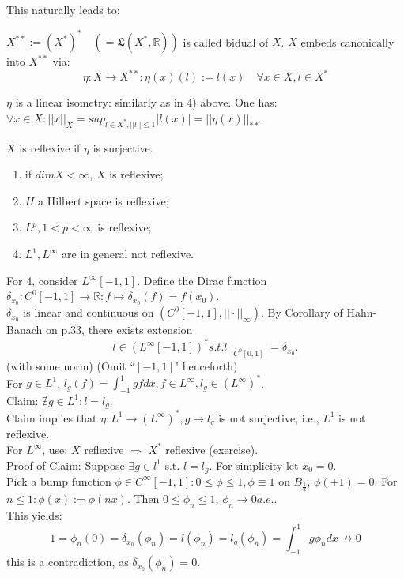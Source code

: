 \documentclass{article}
\begin{document}
This naturally leads to:\begin{definition}
    $X^{**} := (X^*)^* \quad (=\mathfrak{L}(X^*,\mathbb{R}))$ is called bidual of $X$. $X$ embeds canonically into $X^{**}$ via: $$ \eta : X\rightarrow X^{**}: \eta(x)(l) := l(x) \quad \forall x \in X, l \in X^*$$ 
\end{definition}
\begin{remark}
    $\eta$ is a linear isometry: similarly as in 4) above. One has: $\forall x \in X: ||x||_X = sup_{l\in X^*, ||l|| \leq 1} |l(x)| = ||\eta(x)||_{**}$.
\end{remark}

\begin{definition}
    $X$ is reflexive if $\eta$ is surjective.
\end{definition}

\begin{eg}
\begin{enumerate}
    \item if $dimX<\infty$, $X$ is reflexive;
    \item $H$ a Hilbert space is reflexive;
    \item $L^p, 1<p<\infty$ is reflexive;
    \item $L^1, L^\infty$ are in general not reflexive.
\end{enumerate}
For 4, consider $L^\infty[-1,1]$. Define the Dirac function $\delta_{x_0}: C^0[-1,1] \rightarrow \mathbb{R}: f \mapsto \delta_{x_0}(f) = f(x_0)$.\\
$\delta_{x_0}$ is linear and continuous on $(C^0[-1,1],||\cdot ||_\infty)$. By Corollary of Hahn-Banach on p.33, there exists extension 
$$l\in (L^\infty [-1,1])^* s.t. l\mid_{C^0[0,1]} = \delta_{x_0}.$$
(with some norm) (Omit \textquotedblleft $[-1,1]$" henceforth) \\
For $g\in L^1$, $l_g(f) = \int_{-1}^1 gf dx, f\in L^\infty, l_g\in (L^\infty)^*$.
\\Claim: $\nexists g\in L^1: l=l_g$.
\\Claim implies that $\eta: L^1 \rightarrow (L^\infty)^*, g \mapsto l_g$ is not surjective, i.e., $L^1$ is not reflexive.\\
For $L^\infty$, use: $X$ reflexive $\Rightarrow$ $X^*$ reflexive (exercise).\\
Proof of Claim: Suppose $\exists g\in l^1$ s.t. $l=l_g$. For simplicity let $x_0=0$.\\
Pick a bump function $\phi \in C^\infty [-1,1]: 0 \leq \phi \leq 1, \phi \equiv 1$ on $B_{\frac{1}{2}}$, $\phi(\pm 1)=0$. For $n\leq 1: \phi(x) := \phi(nx)$. Then $0\leq \phi_n \leq 1$, $\phi_n \rightarrow 0 a.e.$.\\
This yields: $$1 = \phi_n(0)=\delta_{x_0}(\phi_n) = l(\phi_n) = l_g(\phi_n) = \int_{-1}^1 g\phi_n dx \nrightarrow 0$$
this is a contradiction, as $\delta_{x_0}(\phi_n) = 0$.
\end{eg}
\end{document}
